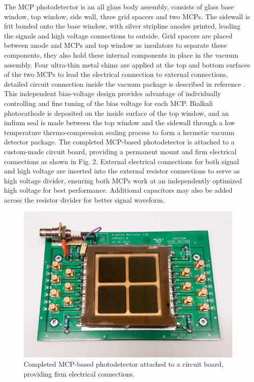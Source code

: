 \documentclass[preprint,5p]{elsarticle}
\begin{document}
The MCP photodetector is an all glass body assembly, consists of glass base 
window, top window, side wall, three grid spacers and two MCPs. The sidewall is 
frit bonded onto the base window, with silver stripline anodes printed, leading 
the signals and high voltage connections to outside. Grid spacers are placed 
between anode and MCPs and top window as insulators to separate these 
components, they also hold these internal components in place in the vacuum 
assembly. Four ultra-thin metal shims are applied at the top and bottom 
surfaces of the two MCPs to lead the electrical connection to external 
connections, detailed circuit connection inside the vacuum package is described 
in reference \cite{Xia-MCPs}. This independent bias-voltage design provides 
advantage of individually controlling and fine tuning of the bias voltage for 
each MCP. Bialkali photocathode is deposited on the inside surface of the top 
window, and an indium seal is made between the top window and the sidewall 
through a low temperature thermo-compression sealing process to form a hermetic 
vacuum detector package. The completed MCP-based photodetector is attached to a 
custom-made circuit board, providing a permanent mount and firm electrical 
connections as shown in Fig. 2. External electrical connections for both signal 
and high voltage are inserted into the external resistor connections to serve 
as high voltage divider, ensuring both MCPs work at an independently optimized 
high voltage for best performance. Additional capacitors may also be added 
across the resistor divider for better signal waveform.  

\begin{figure}[tbp]
\centering 
\includegraphics[scale=0.23]{fig/MCPs_assembly.png}
\caption{Completed MCP-based photodetector attached to a circuit board, 
providing firm electrical connections.} \label{fig:MCP_assm}
\end{figure}
\end{document}
